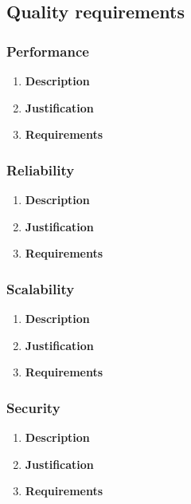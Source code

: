 \documentclass[a4paper,10pt]{article}
\begin{document}
\subsection{Quality requirements}
\subsubsection{Performance}
\begin{enumerate}
\item \textbf{Description} \\

\item \textbf{Justification} \\
\item \textbf{Requirements}
\end{enumerate}
\subsubsection{Reliability}
\begin{enumerate}
\item \textbf{Description} \\

\item \textbf{Justification} \\ 
\item \textbf{Requirements}
\end{enumerate}
\subsubsection{Scalability}
\begin{enumerate}
\item \textbf{Description} \\

\item \textbf{Justification} \\
\item \textbf{Requirements}
\end{enumerate}
\subsubsection{Security}
\begin{enumerate}
\item \textbf{Description} \\

\item \textbf{Justification} \\

\item \textbf{Requirements}

\end{enumerate}
\end{document}
